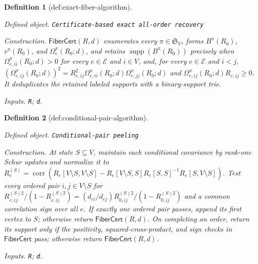 \documentclass{article}
\newtheorem{definition}{Definition}
\begin{document}
\begin{definition}[def:exact-fiber-algorithm]\label{def:exact-fiber-algorithm}
\par\smallskip\noindent\emph{Defined object.} \texttt{Certificate-\allowbreak{}based exact all-\allowbreak{}order recovery}
\par\smallskip\noindent\emph{Construction.} \(\mathsf{FiberCert}(R,d)\) enumerates every \(\pi\in\mathfrak S_V\), forms \(B^{\pi}(R_0)\), \(v^{\pi}(R_0)\), and \(\Omega_e^{\pi}(R_0;d)\), and retains \(\operatorname{supp}(B^{\pi}(R_0))\) precisely when \(\Omega_{e,ii}^{\pi}(R_0;d)>0\) for every \(e\in\mathcal E\) and \(i\in V\), and, for every \(e\in\mathcal E\) and \(i<j\), \((\Omega_{e,ij}^{\pi}(R_0;d))^2=R_{e,ij}^2\Omega_{e,ii}^{\pi}(R_0;d)\Omega_{e,jj}^{\pi}(R_0;d)\) and \(\Omega_{e,ij}^{\pi}(R_0;d)R_{e,ij}\ge0\). It deduplicates the retained labeled supports with a binary-support trie.
\par\smallskip\noindent\emph{Inputs.} \texttt{R}; \texttt{d}.
\end{definition}

\begin{definition}[def:conditional-pair-algorithm]\label{def:conditional-pair-algorithm}
\par\smallskip\noindent\emph{Defined object.} \texttt{Conditional-\allowbreak{}pair peeling}
\par\smallskip\noindent\emph{Construction.} At state \(S\subseteq V\), maintain each conditional covariance by rank-one Schur updates and normalize it to \(R_e^{(S)}=\operatorname{corr}(R_e[V\setminus S,V\setminus S]-R_e[V\setminus S,S]R_e[S,S]^{-1}R_e[S,V\setminus S])\). Test every ordered pair \(i,j\in V\setminus S\) for \(R_{e,ij}^{(S)2}/(1-R_{e,ij}^{(S)2})=(d_{ei}/d_{ej})R_{0,ij}^{(S)2}/(1-R_{0,ij}^{(S)2})\) and a common correlation sign over all \(e\). If exactly one ordered pair passes, append its first vertex to \(S\); otherwise return \(\mathsf{FiberCert}(R,d)\). On completing an order, return its support only if the positivity, squared-cross-product, and sign checks in \(\mathsf{FiberCert}\) pass; otherwise return \(\mathsf{FiberCert}(R,d)\).
\par\smallskip\noindent\emph{Inputs.} \texttt{R}; \texttt{d}.
\end{definition}
\end{document}
